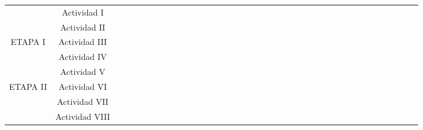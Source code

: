 \begin{table}[H]
\begin{tabular}{cc|llll|llll|llll|llll|llll|llll|llll|llll|llll|}
\multicolumn{1}{|c|}{\cellcolor[HTML]{FFCE93}} & \cellcolor[HTML]{FFCE93}Actividad I & \cellcolor[HTML]{FFFE65} & \cellcolor[HTML]{FFFE65} & \cellcolor[HTML]{FFFE65}{\color[HTML]{FFFC9E} } & \cellcolor[HTML]{FFFE65} & \cellcolor[HTML]{FFFE65} &  &  &  &  &  &  &  &  &  &  &  &  &  &  &  &  &  &  &  &  &  &  &  &  &  &  &  &  &  &  &  \\ \cline{2-38} 
\multicolumn{1}{|c|}{\cellcolor[HTML]{FFCE93}} & \cellcolor[HTML]{FFCE93}Actividad II &  &  &  &  &  & \cellcolor[HTML]{FFFE65} & \cellcolor[HTML]{FFFE65} &  &  &  &  &  &  &  &  &  &  &  &  &  &  &  &  &  &  &  &  &  &  &  &  &  &  &  &  &  \\ \cline{2-38} 
\multicolumn{1}{|c|}{\multirow{-3}{*}{\cellcolor[HTML]{FFCE93}ETAPA I}} & \cellcolor[HTML]{FFCE93}Actividad III &  &  &  &  &  &  &  & \cellcolor[HTML]{FFFE65} & \cellcolor[HTML]{FFFE65} &  &  &  &  &  &  &  &  &  &  &  &  &  &  &  &  &  &  &  &  &  &  &  &  &  &  &  \\ \hline
\multicolumn{1}{|c|}{\cellcolor[HTML]{FFCE93}} & \cellcolor[HTML]{FFCE93}Actividad IV &  &  &  &  &  &  &  &  &  & \cellcolor[HTML]{6200C9} & \cellcolor[HTML]{6200C9} & \cellcolor[HTML]{6200C9} & \cellcolor[HTML]{6200C9} &  &  &  &  &  &  &  &  &  &  &  &  &  &  &  &  &  &  &  &  &  &  &  \\ \cline{2-38} 
\multicolumn{1}{|c|}{\cellcolor[HTML]{FFCE93}} & \cellcolor[HTML]{FFCE93}Actividad V &  &  &  &  &  &  &  &  &  &  &  &  &  & \cellcolor[HTML]{6200C9} & \cellcolor[HTML]{6200C9} & \cellcolor[HTML]{6200C9} &  &  &  &  &  &  &  &  &  &  &  &  &  &  &  &  &  &  &  &  \\ \cline{2-38} 
\multicolumn{1}{|c|}{\multirow{-3}{*}{\cellcolor[HTML]{FFCE93}ETAPA II}} & \cellcolor[HTML]{FFCE93}Actividad VI &  &  &  &  &  &  &  &  &  &  &  &  &  &  &  &  & \cellcolor[HTML]{6200C9} & \cellcolor[HTML]{6200C9} &  &  &  &  &  &  &  &  &  &  &  &  &  &  &  &  &  &  \\ \hline
\multicolumn{1}{|c|}{\cellcolor[HTML]{FFCE93}} & \cellcolor[HTML]{FFCE93}Actividad VII &  &  &  &  &  &  &  &  &  &  &  &  &  &  &  &  &  &  & \cellcolor[HTML]{32CB00} & \cellcolor[HTML]{32CB00} & \cellcolor[HTML]{32CB00} & \cellcolor[HTML]{32CB00} &  &  &  &  &  &  &  &  &  &  &  &  &  &  \\ \cline{2-38} 
\multicolumn{1}{|c|}{\cellcolor[HTML]{FFCE93}} & \cellcolor[HTML]{FFCE93}Actividad VIII &  &  &  &  &  &  &  &  &  &  &  &  &  &  &  &  &  &  &  &  &  &  & \cellcolor[HTML]{32CB00} & \cellcolor[HTML]{32CB00} & \cellcolor[HTML]{32CB00} & \cellcolor[HTML]{32CB00} &  &  &  &  &  &  &  &  &  &  \\ \cline{2-38} 

\end{tabular}
\end{table}

